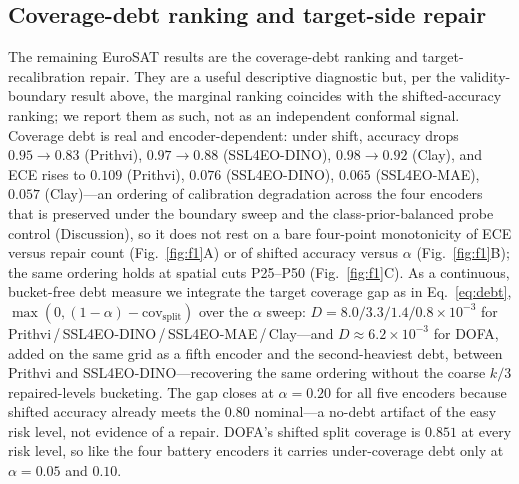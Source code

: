 \documentclass[preprint,11pt,authoryear]{elsarticle}
\begin{document}
\subsection*{Coverage-debt ranking and target-side repair}
The remaining EuroSAT results are the coverage-debt ranking and target-recalibration repair. They are a
useful descriptive diagnostic but, per the validity-boundary result above, the marginal ranking coincides
with the shifted-accuracy ranking; we report them as such, not as an independent conformal signal.
Coverage debt is real and encoder-dependent: under shift, accuracy drops $0.95\to0.83$ (Prithvi),
$0.97\to0.88$ (SSL4EO-DINO), $0.98\to0.92$ (Clay), and ECE rises to $0.109$ (Prithvi),
$0.076$ (SSL4EO-DINO), $0.065$ (SSL4EO-MAE), $0.057$ (Clay)---an ordering of calibration degradation across
the four encoders that is preserved under the boundary sweep and the
class-prior-balanced probe control (Discussion), so it does not rest on a bare four-point monotonicity
of ECE versus repair count (Fig.~\ref{fig:f1}A) or of shifted accuracy versus $\alpha$ (Fig.~\ref{fig:f1}B);
the same ordering holds at spatial cuts P25--P50 (Fig.~\ref{fig:f1}C). As a continuous, bucket-free debt measure we integrate the target coverage gap
as in Eq.~\eqref{eq:debt},
$\max(0,(1-\alpha)-\mathrm{cov}_{\mathrm{split}})$ over the $\alpha$ sweep:
$D = 8.0 / 3.3 / 1.4 / 0.8 \times 10^{-3}$ for Prithvi\,/\,SSL4EO-DINO\,/\,SSL4EO-MAE\,/\,Clay---and $D\approx6.2\times10^{-3}$ for DOFA, added on the same grid as a fifth encoder and the second-heaviest debt, between Prithvi and SSL4EO-DINO---recovering the
same ordering without the coarse $k/3$ repaired-levels bucketing. The gap closes at $\alpha=0.20$ for all
five encoders because shifted accuracy already meets the $0.80$ nominal---a no-debt artifact of the
easy risk level, not evidence of a repair. DOFA's shifted split coverage is $0.851$ at every risk level, so
like the four battery encoders it carries under-coverage debt only at $\alpha=0.05$ and $0.10$.
\end{document}
